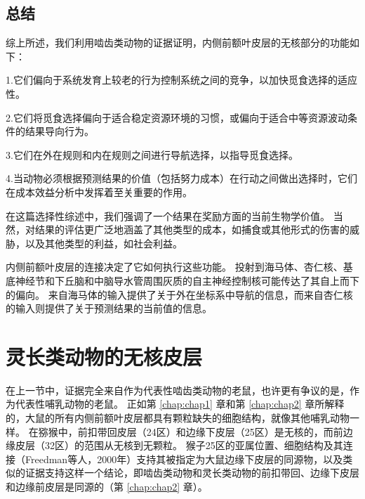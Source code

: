 \subsection{总结}

综上所述，我们利用啮齿类动物的证据证明，内侧前额叶皮层的无核部分的功能如下：\par


1.它们偏向于系统发育上较老的行为控制系统之间的竞争，以加快觅食选择的适应性。\par


2.它们将觅食选择偏向于适合稳定资源环境的习惯，或偏向于适合中等资源波动条件的结果导向行为。\par


3.它们在外在规则和内在规则之间进行导航选择，以指导觅食选择。\par


4.当动物必须根据预测结果的价值（包括努力成本）在行动之间做出选择时，它们在成本效益分析中发挥着至关重要的作用。\par


在这篇选择性综述中，我们强调了一个结果在奖励方面的当前生物学价值。
当然，对结果的评估更广泛地涵盖了其他类型的成本，如捕食或其他形式的伤害的威胁，以及其他类型的利益，如社会利益。\par


内侧前额叶皮层的连接决定了它如何执行这些功能。
投射到海马体、杏仁核、基底神经节和下丘脑和中脑导水管周围灰质的自主神经控制核可能传达了其自上而下的偏向。
来自海马体的输入提供了关于外在坐标系中导航的信息，而来自杏仁核的输入则提供了关于预测结果的当前值的信息。\par



\section{灵长类动物的无核皮层}

在上一节中，证据完全来自作为代表性啮齿类动物的老鼠，也许更有争议的是，作为代表性哺乳动物的老鼠。
正如第 \ref{chap:chap1} 章和第 \ref{chap:chap2} 章所解释的，大鼠的所有内侧前额叶皮层都具有颗粒缺失的细胞结构，就像其他哺乳动物一样。
在猕猴中，前扣带回皮层（24区）和边缘下皮层（25区）是无核的，而前边缘皮层（32区）的范围从无核到无颗粒\cite{Vogt&Derbyshire,2009;Mackey&Petrides,2010}。
猴子25区的亚属位置、细胞结构及其连接（Freedman等人，2000年）支持其被指定为大鼠边缘下皮层的同源物，以及类似的证据支持这样一个结论，即啮齿类动物和灵长类动物的前扣带回、边缘下皮层和边缘前皮层是同源的（第 \ref{chap:chap2} 章）。\par



